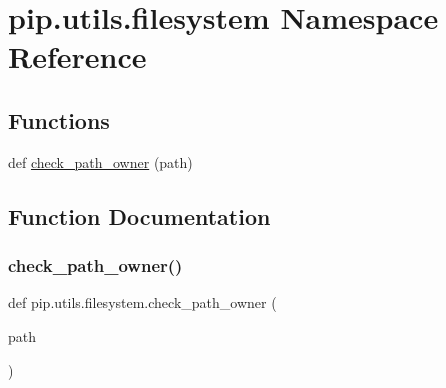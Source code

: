 \hypertarget{namespacepip_1_1utils_1_1filesystem}{}\section{pip.\+utils.\+filesystem Namespace Reference}
\label{namespacepip_1_1utils_1_1filesystem}
\subsection*{Functions}
\begin{DoxyCompactItemize}
\item 
def \hyperlink{namespacepip_1_1utils_1_1filesystem_a661eefa2232299d0e2609b5df4d09faf}{check\+\_\+path\+\_\+owner} (path)
\end{DoxyCompactItemize}


\subsection{Function Documentation}
\mbox{\label{namespacepip_1_1utils_1_1filesystem_a661eefa2232299d0e2609b5df4d09faf}} 
\subsubsection{\texorpdfstring{check\+\_\+path\+\_\+owner()}{check\_path\_owner()}}
{\footnotesize\ttfamily def pip.\+utils.\+filesystem.\+check\+\_\+path\+\_\+owner (\begin{DoxyParamCaption}\item[{}]{path }\end{DoxyParamCaption})}

